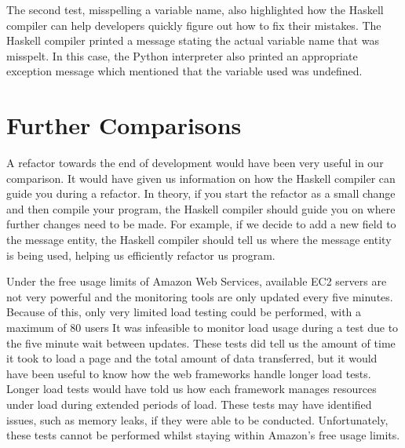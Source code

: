 The second test, misspelling a variable name, also highlighted how
the Haskell compiler can help developers quickly figure out how
to fix their mistakes. The Haskell compiler printed a message
stating the actual variable name that was misspelt. In this case,
the Python interpreter also printed an appropriate exception message
which mentioned that the variable used was undefined.

\section{Further Comparisons}

A refactor towards the end of development would have been very
useful in our comparison. It would have given us information on
how the Haskell compiler can guide you during a refactor. In
theory, if you start the refactor as a small change and
then compile your program, the Haskell compiler should guide you
on where further changes need to be made. For example, if we
decide to add a new field to the message entity, the Haskell
compiler should tell us where the message entity is being used,
helping us efficiently refactor us program.

Under the free usage limits of Amazon Web Services, available EC2 
servers are not very powerful and the monitoring tools are only 
updated every five minutes. Because of this, only very limited
load testing could be performed, with a maximum of 80 users It
was infeasible to monitor load usage during a test due to the
five minute wait between updates. These tests did tell us the
amount of time it took to load a page and the total amount of
data transferred, but it would have been useful to know how the
web frameworks handle longer load tests. Longer load tests would
have told us how each framework manages resources under load
during extended periods of load. These tests may have identified
issues, such as memory leaks, if they were able to be conducted.
Unfortunately, these tests cannot be performed whilst staying
within Amazon's free usage limits.
